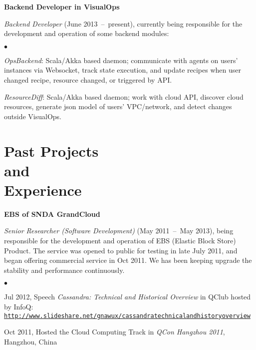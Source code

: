 \documentclass[a4paper,margin,line]{res}
\newenvironment{list1}{
  \begin{list}{\ding{113}}{%
      \setlength{\itemsep}{0in}
      \setlength{\parsep}{0in} \setlength{\parskip}{0in}
      \setlength{\topsep}{0in} \setlength{\partopsep}{0in} 
      \setlength{\leftmargin}{0.17in}}}{\end{list}}
\newenvironment{list2}{
  \begin{list}{$\bullet$}{%
      \setlength{\itemsep}{0in}
      \setlength{\parsep}{0in} \setlength{\parskip}{0in}
      \setlength{\topsep}{0in} \setlength{\partopsep}{0in} 
      \setlength{\leftmargin}{0.2in}}}{\end{list}}
\newcommand{\http}{http:/\hspace{-0.3ex}/}
\newcommand{\hindent}{\mbox{\hspace{8ex}}}
\begin{document}
\begin{resume}
\textbf{Backend Developer in VisualOps}\\
\vspace*{-.1in}
\begin{list1}
\item[] \emph{Backend Developer}\/ (June 2013~--~present), currently being responsible for the development and operation of some backend modules:
\begin{list2}
\vspace*{.05in}
\item \textit{OpsBackend}: Scala/Akka based daemon; communicate with agents on users' instances via Websocket, track state execution, and update recipes when user changed recipe, resource changed, or triggered by API.
\item \textit{ResourceDiff}: Scala/Akka based daemon; work with cloud API, discover cloud resources, generate json model of users' VPC/network, and detect changes outside VisualOps.
\end{list2}
\end{list1}

\section{\sc Past Projects\\ and\\ Experience}
\textbf{EBS of SNDA GrandCloud}\\
\vspace*{-.1in}
\begin{list1}
\item[] \emph{Senior Researcher (Software Development)}\/ (May 2011~--~May 2013), being responsible for the development and operation of EBS (Elastic Block Store) Product. The service was opened to public for testing in late July 2011, and began offering commercial service in Oct 2011. We has been keeping upgrade the stability and performance continuously.  
\begin{list2}
\vspace*{.05in}
\item Jul 2012, Speech \textit{Cassandra: Technical and Historical Overview}\/ in QClub hosted by InfoQ:\\ \hindent\href{http://www.slideshare.net/gnawux/cassandratechnicalandhistoryoverview}{\tt\http{}www.slideshare.net/gnawux/cassandratechnicalandhistoryoverview}
\item Oct 2011, Hosted the Cloud Computing Track in \emph{QCon Hangzhou 2011}, Hangzhou, China
\end{list2}
\end{list1}


\end{resume}
\end{document}
